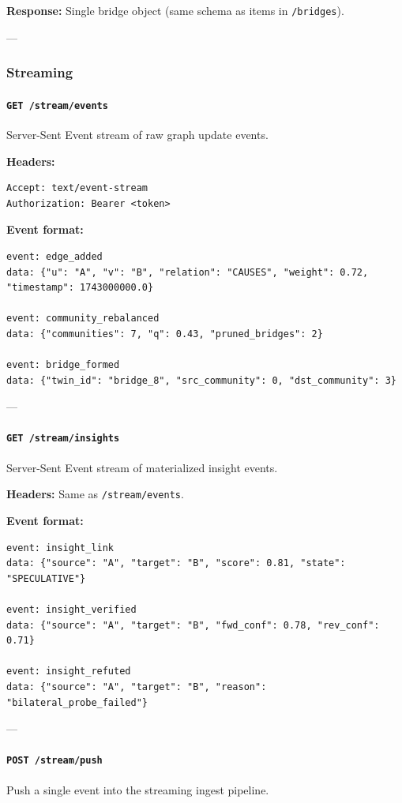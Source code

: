 \documentclass[11pt,article,oneside]{memoir}
\begin{document}
\textbf{Response:} Single bridge object (same schema as items in \texttt{/bridges}).

---

\subsubsection{Streaming}

\paragraph{\texttt{GET /stream/events}}
Server-Sent Event stream of raw graph update events.

\textbf{Headers:}
\begin{lstlisting}
Accept: text/event-stream
Authorization: Bearer <token>
\end{lstlisting}

\textbf{Event format:}
\begin{lstlisting}
event: edge_added
data: {"u": "A", "v": "B", "relation": "CAUSES", "weight": 0.72, "timestamp": 1743000000.0}

event: community_rebalanced
data: {"communities": 7, "q": 0.43, "pruned_bridges": 2}

event: bridge_formed
data: {"twin_id": "bridge_8", "src_community": 0, "dst_community": 3}
\end{lstlisting}

---

\paragraph{\texttt{GET /stream/insights}}
Server-Sent Event stream of mater\-ialized insight events.

\textbf{Headers:} Same as \texttt{/stream/events}.

\textbf{Event format:}
\begin{lstlisting}
event: insight_link
data: {"source": "A", "target": "B", "score": 0.81, "state": "SPECULATIVE"}

event: insight_verified
data: {"source": "A", "target": "B", "fwd_conf": 0.78, "rev_conf": 0.71}

event: insight_refuted
data: {"source": "A", "target": "B", "reason": "bilateral_probe_failed"}
\end{lstlisting}

---

\paragraph{\texttt{POST /stream/push}}
Push a single event into the streaming ingest pipeline.
\end{document}
